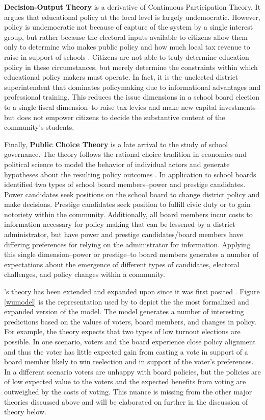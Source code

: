 \textbf{Decision-Output Theory} is a derivative of Continuous Participation Theory. It argues that educational policy at the local level is largely undemocratic. However, policy is undemocratic not because of capture of the system by a single interest group, but rather because the electoral inputs available to citizens allow them only to determine who makes public policy and how much local tax revenue to raise in support of schools \citep{RefWorks:283}. Citizens are not able to truly determine education policy in these circumstances, but merely determine the constraints within which educational policy  makers must operate. In fact, it is the unelected district superintendent that dominates policymaking due to informational advantages and professional training. This reduces the issue dimensions in a school board election to a single fiscal dimension--to raise tax levies and  make new capital investments--but does not empower citizens to decide the substantive content of the community's students. 

Finally, \textbf{Public Choice Theory} is a late arrival to the study of school governance. The theory follows the rational choice tradition in economics and political science to model the behavior of individual actors and generate hypotheses about the resulting policy outcomes \citep{RefWorks:351}. In application to school boards \citet{RefWorks:336} identified two types of school board members--power and prestige candidates. Power candidates seek positions on the school board to change district policy and make decisions. Prestige candidates seek position to fulfill civic duty or to gain notoriety within the community. Additionally, all board members incur costs to information necessary for policy making that can be lessened by a district administrator, but have power and prestige candidates/board members have differing preferences for relying on the administrator for information. Applying this single dimension--power or prestige--to board members generates a number of expectations about the emergence of different types of candidates, electoral challenges, and policy changes within a community. 

\citet{RefWorks:336}'s theory has been extended and expanded upon since it was first posited \citep{RefWorks:339,RefWorks:340,RefWorks:243}. Figure \ref{wumodel} is the representation used by \citet{RefWorks:243} to depict the the most formalized and expanded version of the model. The model generates a number of interesting predictions based on the values of voters, board members, and changes in policy. For example, the theory expects that two types of low turnout elections are possible. In one scenario, voters and the board experience close policy alignment and thus the voter has little expected gain from casting a vote in support of a board member likely to win reelection and in support of the voter's preferences. In a different scenario voters are unhappy with board policies, but the policies are of low expected value to the voters and the expected benefits from voting are outweighed by the costs of voting. This nuance is missing from the other major theories discussed above and will be elaborated on further in the discussion of theory below.

